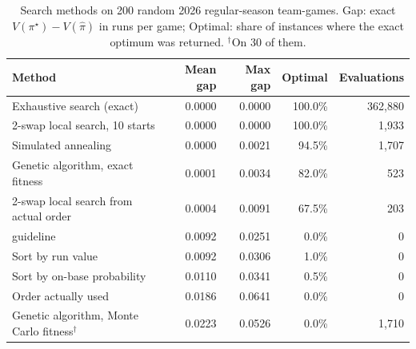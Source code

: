 \begin{table}[t]\centering\small
\caption{Search methods on 200 random 2026 regular-season team-games. Gap: exact $V(\pi^\star)-V(\hat\pi)$ in runs per game; Optimal: share of instances where the exact optimum was returned. $^\dagger$On 30 of them.}\label{tab:e4a}
\begin{tabular}{lrrrr}\toprule
Method & Mean gap & Max gap & Optimal & Evaluations\\ \midrule
Exhaustive search (exact) & 0.0000 & 0.0000 & 100.0\% & 362,880 \\
2-swap local search, 10 starts & 0.0000 & 0.0000 & 100.0\% & 1,933 \\
Simulated annealing & 0.0000 & 0.0021 & 94.5\% & 1,707 \\
Genetic algorithm, exact fitness & 0.0001 & 0.0034 & 82.0\% & 523 \\
2-swap local search from actual order & 0.0004 & 0.0091 & 67.5\% & 203 \\
\citeauthor{tango2007} guideline & 0.0092 & 0.0251 & 0.0\% & 0 \\
Sort by run value & 0.0092 & 0.0306 & 1.0\% & 0 \\
Sort by on-base probability & 0.0110 & 0.0341 & 0.5\% & 0 \\
Order actually used & 0.0186 & 0.0641 & 0.0\% & 0 \\
Genetic algorithm, Monte Carlo fitness$^\dagger$ & 0.0223 & 0.0526 & 0.0\% & 1,710 \\
\bottomrule\end{tabular}\end{table}
